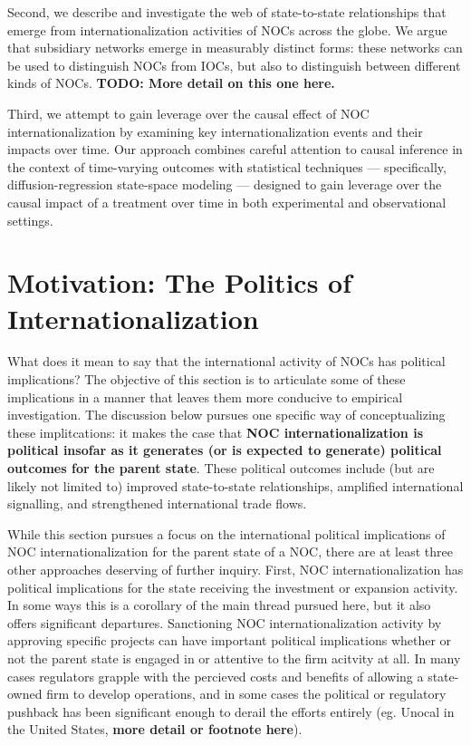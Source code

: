 \documentclass[11pt,]{book}
\begin{document}
Second, we describe and investigate the web of state-to-state relationships that emerge from internationalization activities of NOCs across the globe. We argue that subsidiary networks emerge in measurably distinct forms: these networks can be used to distinguish NOCs from IOCs, but also to distinguish between different kinds of NOCs. \textbf{TODO: More detail on this one here.}

Third, we attempt to gain leverage over the causal effect of NOC internationalization by examining key internationalization events and their impacts over time. Our approach combines careful attention to causal inference in the context of time-varying outcomes with statistical techniques --- specifically, diffusion-regression state-space modeling --- designed to gain leverage over the causal impact of a treatment over time in both experimental and observational settings.

\hypertarget{motiv03}{%
\section{Motivation: The Politics of Internationalization}\label{motiv03}}

What does it mean to say that the international activity of NOCs has political implications? The objective of this section is to articulate some of these implications in a manner that leaves them more conducive to empirical investigation. The discussion below pursues one specific way of conceptualizing these implitcations: it makes the case that \textbf{NOC internationalization is political insofar as it generates (or is expected to generate) political outcomes for the parent state}. These political outcomes include (but are likely not limited to) improved state-to-state relationships, amplified international signalling, and strengthened international trade flows.

While this section pursues a focus on the international political implications of NOC internationalization for the parent state of a NOC, there are at least three other approaches deserving of further inquiry. First, NOC internationalization has political implications for the state receiving the investment or expansion activity. In some ways this is a corollary of the main thread pursued here, but it also offers significant departures. Sanctioning NOC internationalization activity by approving specific projects can have important political implications whether or not the parent state is engaged in or attentive to the firm acitvity at all. In many cases regulators grapple with the percieved costs and benefits of allowing a state-owned firm to develop operations, and in some cases the political or regulatory pushback has been significant enough to derail the efforts entirely (eg. Unocal in the United States, \textbf{more detail or footnote here}).
\end{document}
